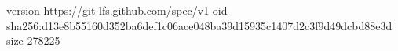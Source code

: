 version https://git-lfs.github.com/spec/v1
oid sha256:d13e8b55160d352ba6def1c06ace048ba39d15935c1407d2c3f9d49dcbd88e3d
size 278225
